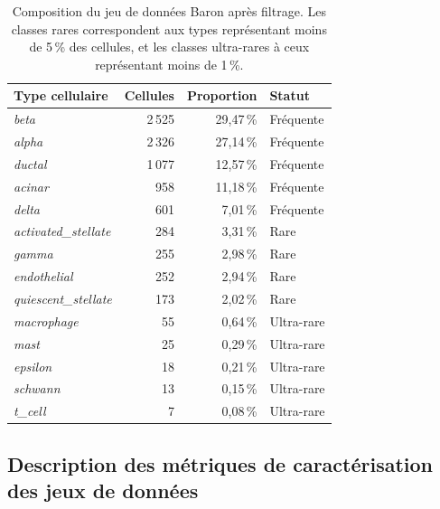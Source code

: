 \begin{table}[H]
    \centering
    \small
    \begin{tabular}{lrrl}
        \toprule
        \textbf{Type cellulaire} & \textbf{Cellules} & \textbf{Proportion} & \textbf{Statut} \\
        \midrule
        \textit{beta} & 2\,525 & 29,47\,\% & Fréquente \\
        \textit{alpha} & 2\,326 & 27,14\,\% & Fréquente \\
        \textit{ductal} & 1\,077 & 12,57\,\% & Fréquente \\
        \textit{acinar} & 958 & 11,18\,\% & Fréquente \\
        \textit{delta} & 601 & 7,01\,\% & Fréquente \\
        \textit{activated\_stellate} & 284 & 3,31\,\% & Rare \\
        \textit{gamma} & 255 & 2,98\,\% & Rare \\
        \textit{endothelial} & 252 & 2,94\,\% & Rare \\
        \textit{quiescent\_stellate} & 173 & 2,02\,\% & Rare \\
        \textit{macrophage} & 55 & 0,64\,\% & Ultra-rare \\
        \textit{mast} & 25 & 0,29\,\% & Ultra-rare \\
        \textit{epsilon} & 18 & 0,21\,\% & Ultra-rare \\
        \textit{schwann} & 13 & 0,15\,\% & Ultra-rare \\
        \textit{t\_cell} & 7 & 0,08\,\% & Ultra-rare \\
        \bottomrule
    \end{tabular}
    \caption{Composition du jeu de données Baron après filtrage. Les classes rares correspondent aux types représentant moins de 5\,\% des cellules, et les classes ultra-rares à ceux représentant moins de 1\,\%.}
    \label{tab:classes_baron}
\end{table}

\subsection*{Description des métriques de caractérisation des jeux de données}


